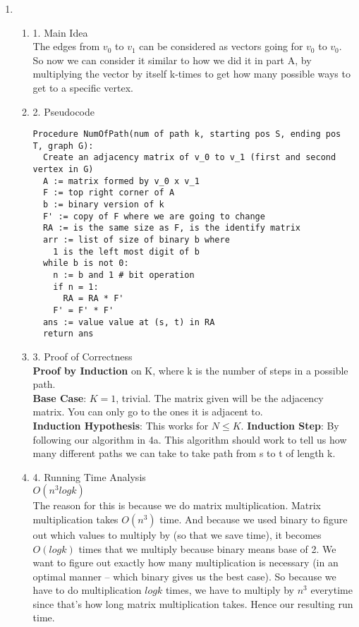 \documentclass[11pt]{article}
\newenvironment{qparts}{\begin{enumerate}[{(}a{)}]}{\end{enumerate}}
\begin{document}
\begin{qparts}
If we want to calculate the new value of $(1,1)$, we would do the following to calculate it: $(A^N)_{1,1} = (v_{1,1}u_{1,1} + v_{2,1}u_{1,2} + v_{3,1}u_{1,3})$ because this is essentially multiplying the different possible paths and routes in two different case. And as a result, we add all the values together as the possible amount of paths to go to. 

\item \begin{qparts}
\item[1.] Main Idea \\
The edges from $v_0$ to $v_1$ can be considered as vectors going for $v_0$ to $v_0$. So now we can consider it similar to how we did it in part A, by multiplying the vector by itself k-times to get how many possible ways to get to a specific vertex. 
\item[2.] Pseudocode 
\begin{verbatim}
Procedure NumOfPath(num of path k, starting pos S, ending pos T, graph G):
  Create an adjacency matrix of v_0 to v_1 (first and second vertex in G)
  A := matrix formed by v_0 x v_1
  F := top right corner of A
  b := binary version of k 
  F' := copy of F where we are going to change
  RA := is the same size as F, is the identify matrix
  arr := list of size of binary b where
    1 is the left most digit of b
  while b is not 0:
    n := b and 1 # bit operation
    if n = 1:
      RA = RA * F'
    F' = F' * F'
  ans := value value at (s, t) in RA
  return ans
\end{verbatim}
\item[3.] Proof of Correctness \\
\textbf{Proof by Induction} on K, where k is the number of steps in a possible path.\\
\textbf{Base Case}: $K = 1$, trivial. The matrix given will be the adjacency matrix. You can only go to the ones it is adjacent to. \\
\textbf{Induction Hypothesis}: This works for $N \leq K$. 
\textbf{Induction Step}: By following our algorithm in 4a. This algorithm should work to tell us how many different paths we can take to take path from s to t of length k. 
\item[4.] Running Time Analysis \\
$O(n^3logk)$ \\

The reason for this is because we do matrix multiplication. Matrix multiplication takes $O(n^3)$ time. And because we used binary to figure out which values to multiply by (so that we save time), it becomes $O(logk)$ times that we multiply because binary means base of 2. We want to figure out exactly how many multiplication is necessary (in an optimal manner -- which binary gives us the best case). So because we have to do multiplication $logk$ times, we have to multiply by $n^3$ everytime since that's how long matrix multiplication takes. Hence our resulting run time. 

\end{qparts}
\end{qparts}
\newpage
\end{document}
